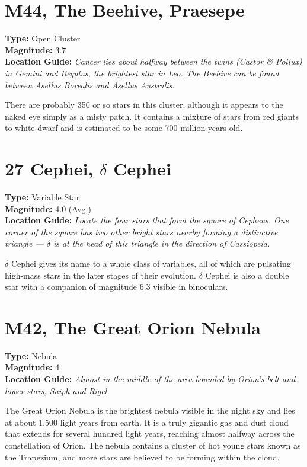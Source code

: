 \section{M44, The Beehive, Praesepe}
\textbf{Type:} Open Cluster \\
\textbf{Magnitude:} 3.7 \\ 
\textbf{Location Guide:} \textit{Cancer lies about halfway between the twins (Castor \& Pollux) in Gemini and Regulus, the brightest star in Leo. The Beehive can be found between Asellus Borealis and Asellus Australis.} 

There are probably 350 or so stars in this cluster, although it appears
to the naked eye simply as a misty patch. It contains a mixture of
stars from red giants to white dwarf and is estimated to be some 700
million years old.

\section{27 Cephei, $\delta$ Cephei} 
\textbf{Type:} Variable Star \\
\textbf{Magnitude:} 4.0 (Avg.) \\ 
\textbf{Location Guide:} \textit{Locate the four stars that form the square of Cepheus. One corner of the square has two other bright stars nearby forming a distinctive triangle --- $\delta$ is at the head of this triangle in the direction of Cassiopeia.} 

$\delta$ Cephei gives its name to a whole class of variables, all of
which are pulsating high-mass stars in the later stages of their
evolution. $\delta$ Cephei is also a double star with a companion of
magnitude 6.3 visible in binoculars.

\section{M42, The Great Orion Nebula} 
\textbf{Type:} Nebula \\
\textbf{Magnitude:} 4 \\
\textbf{Location Guide:} \textit{Almost in the middle of the area bounded by Orion's belt and lower stars, Saiph and Rigel.} 

The Great Orion Nebula is the brightest nebula visible in the night
sky and lies at about 1.500 light years from earth. It is a truly
gigantic gas and dust cloud that extends for several hundred light
years, reaching almost halfway across the constellation of Orion. The
nebula contains a cluster of hot young stars known as the Trapezium,
and more stars are believed to be forming within the cloud.

